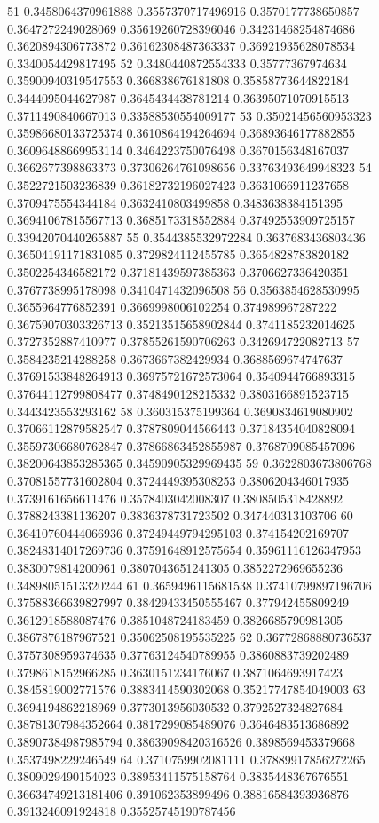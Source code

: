 51 0.3458064370961888 0.3557370717496916 0.3570177738650857 0.3647272249028069 0.35619260728396046 0.34231468254874686 0.3620894306773872 0.36162308487363337 0.36921935628078534 0.3340054429817495
52 0.3480440872554333 0.35777367974634 0.35900940319547553 0.366838676181808 0.35858773644822184 0.3444095044627987 0.3645434438781214 0.36395071070915513 0.3711490840667013 0.33588530554009177
53 0.35021456560953323 0.35986680133725374 0.3610864194264694 0.36893646177882855 0.36096488669953114 0.3464223750076498 0.3670156348167037 0.3662677398863373 0.37306264761098656 0.33763493649948323
54 0.3522721503236839 0.36182732196027423 0.3631066911237658 0.3709475554344184 0.3632410803499858 0.3483638384151395 0.36941067815567713 0.3685173318552884 0.37492553909725157 0.33942070440265887
55 0.3544385532972284 0.3637683436803436 0.36504191171831085 0.3729824112455785 0.3654828783820182 0.3502254346582172 0.37181439597385363 0.3706627336420351 0.3767738995178098 0.3410471432096508
56 0.3563854628530995 0.3655964776852391 0.3669998006102254 0.374989967287222 0.36759070303326713 0.35213515658902844 0.3741185232014625 0.3727352887410977 0.37855261590706263 0.342694722082713
57 0.3584235214288258 0.3673667382429934 0.3688569674747637 0.37691533848264913 0.36975721672573064 0.3540944766893315 0.37644112799808477 0.3748490128215332 0.3803166891523715 0.3443423553293162
58 0.360315375199364 0.3690834619080902 0.37066112879582547 0.3787809044566443 0.37184354040828094 0.35597306680762847 0.37866863452855987 0.3768709085457096 0.38200643853285365 0.34590905329969435
59 0.3622803673806768 0.37081557731602804 0.3724449395308253 0.3806204346017935 0.3739161656611476 0.3578403042008307 0.3808505318428892 0.3788243381136207 0.3836378731723502 0.347440313103706
60 0.36410760444066936 0.37249449794295103 0.374154202169707 0.38248314017269736 0.37591648912575654 0.35961116126347953 0.3830079814200961 0.3807043651241305 0.3852272969655236 0.34898051513320244
61 0.3659496115681538 0.37410799897196706 0.37588366639827997 0.38429433450555467 0.377942455809249 0.3612918588087476 0.3851048724183459 0.3826685790981305 0.3867876187967521 0.35062508195535225
62 0.36772868880736537 0.3757308959374635 0.37763124540789955 0.3860883739202489 0.3798618152966285 0.3630151234176067 0.3871064693917423 0.3845819002771576 0.3883414590302068 0.35217747854049003
63 0.3694194862218969 0.3773013956030532 0.3792527324827684 0.38781307984352664 0.3817299085489076 0.3646483513686892 0.38907384987985794 0.38639098420316526 0.3898569453379668 0.3537498229246549
64 0.3710759902081111 0.37889917856272265 0.3809029490154023 0.38953411575158764 0.3835448367676551 0.36634749213181406 0.391062353899496 0.38816584393936876 0.3913246091924818 0.35525745190787456
